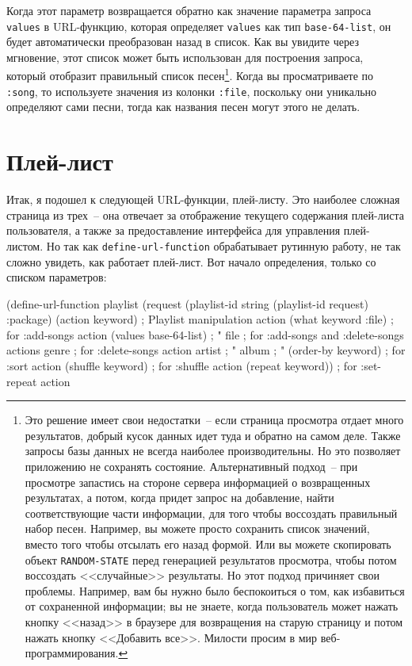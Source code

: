 Когда этот параметр возвращается обратно как значение параметра запроса \lstinline{values}
в URL-функцию, которая определяет \lstinline{values} как тип \lstinline{base-64-list}, он
будет автоматически преобразован назад в список. Как вы увидите через мгновение, этот
список может быть использован для построения запроса, который отобразит правильный список
песен\footnote{Это решение имеет свои недостатки~-- если страница просмотра отдает много
  результатов, добрый кусок данных идет туда и обратно на самом деле. Также запросы базы
  данных не всегда наиболее производительны. Но это позволяет приложению не сохранять
  состояние. Альтернативный подход~-- при просмотре запастись на стороне сервера
  информацией о возвращенных результатах, а потом, когда придет запрос на добавление,
  найти соответствующие части информации, для того чтобы воссоздать правильный набор
  песен. Например, вы можете просто сохранить список значений, вместо того чтобы отсылать
  его назад формой. Или вы можете скопировать объект \lstinline{RANDOM-STATE} перед
  генерацией результатов просмотра, чтобы потом воссоздать <<случайные>> результаты. Но
  этот подход причиняет свои проблемы. Например, вам бы нужно было беспокоиться о том, как
  избавиться от сохраненной информации; вы не знаете, когда пользователь может нажать
  кнопку <<назад>> в браузере для возвращения на старую страницу и потом нажать кнопку
  <<Добавить все>>. Милости просим в мир веб-программирования.}\hspace{\footnotenegspace}. Когда вы просматриваете
по \lstinline{:song}, то используете значения из колонки \lstinline{:file}, поскольку они
уникально определяют сами песни, тогда как названия песен могут этого не делать.

\section{Плей-лист}

Итак, я подошел к следующей URL-функции, плей-листу. Это наиболее сложная страница из
трех~-- она отвечает за отображение текущего содержания плей-листа пользователя, а также за
предоставление интерфейса для управления плей-листом. Но так как \lstinline{define-url-function}
обрабатывает рутинную работу, не так сложно увидеть, как работает плей-лист. Вот начало
определения, только со списком параметров: 

\begin{myverb}
(define-url-function playlist 
    (request
     (playlist-id string (playlist-id request) :package)
     (action keyword)      ; Playlist manipulation action
     (what keyword :file)  ; for :add-songs action
     (values base-64-list) ;             "
     file                  ; for :add-songs and :delete-songs actions
     genre                 ; for :delete-songs action
     artist                ;             "
     album                 ;             "
     (order-by keyword)    ; for :sort action
     (shuffle keyword)     ; for :shuffle action
     (repeat keyword))     ; for :set-repeat action
\end{myverb}

